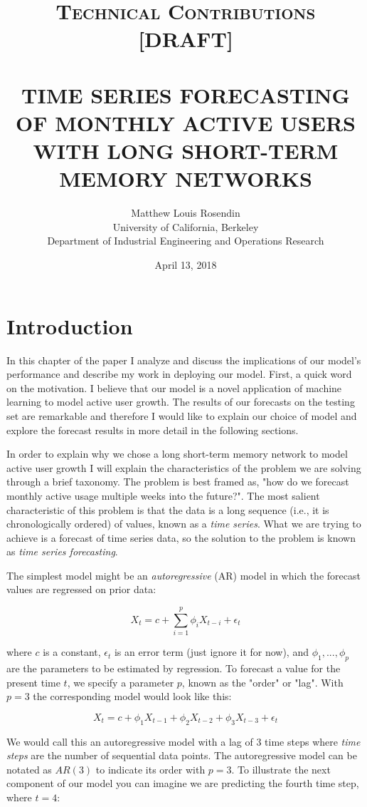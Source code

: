 \documentclass[11pt, oneside]{article}
\title{
  \normalsize \textsc{Technical Contributions [DRAFT]} \\ [2.0cm]
  \HRule{0.5pt} \\
  \LARGE \textbf{\uppercase{
    Time Series Forecasting of Monthly Active Users with Long Short-Term Memory
    Networks
  }}
  \HRule{2pt} \\ [0.5cm]
  \vspace*{5\baselineskip}
}
\author{
  Matthew Louis Rosendin \\
  University of California, Berkeley \\
  Department of Industrial Engineering and Operations Research
}
\date{April 13, 2018}
\begin{document}
\maketitle
\newpage

\tableofcontents
\newpage

\section{Introduction}
In this chapter of the paper I analyze and discuss the implications of our model's performance and describe my work in deploying our model. First, a quick word on the motivation. I believe that our model is a novel application of machine learning to model active user growth. The results of our forecasts on the testing set are remarkable and therefore I would like to explain our choice of model and explore the forecast results in more detail in the following sections.

In order to explain why we chose a long short-term memory network to model active user growth I will explain the characteristics of the problem we are solving through a brief taxonomy. The problem is best framed as, "how do we forecast monthly active usage multiple weeks into the future?". The most salient characteristic of this problem is that the data is a long sequence (i.e., it is chronologically ordered) of values, known as a \textit{time series}. What we are trying to achieve is a forecast of time series data, so the solution to the problem is known as \textit{time series forecasting}.

The simplest model might be an \textit{autoregressive} (AR) model in which the forecast values are regressed on prior data:

\begin{equation}
X_t = c + \sum_{i=1}^p \phi_i X_{t-i} + \epsilon_t
\end{equation}

where $c$ is a constant, $\epsilon_t$ is an error term (just ignore it for now), and $\phi_1, ..., \phi_p$ are the parameters to be estimated by regression. To forecast a value for the present time $t$, we specify a parameter $p$, known as the "order" or "lag". With $p=3$ the corresponding model would look like this:

\begin{equation}
X_t = c + \phi_1 X_{t-1} + \phi_2 X_{t-2} + \phi_3 X_{t-3} + \epsilon_t
\end{equation}

We would call this an autoregressive model with a lag of 3 time steps where \textit{time steps} are the number of sequential data points. The autoregressive model can be notated as $AR(3)$ to indicate its order with $p=3$. To illustrate the next component of our model you can imagine we are predicting the fourth time step, where $t=4$:
\end{document}
